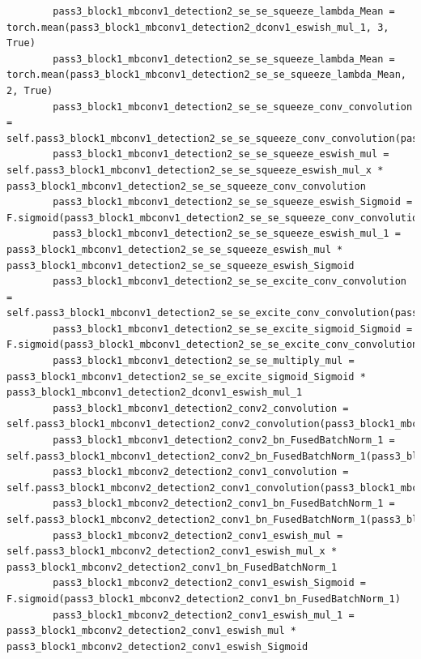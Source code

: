 \documentclass{fisatprojectfinal}
\begin{document}
\begin{appendices}
\begin{lstlisting}
        pass3_block1_mbconv1_detection2_se_se_squeeze_lambda_Mean = torch.mean(pass3_block1_mbconv1_detection2_dconv1_eswish_mul_1, 3, True)
        pass3_block1_mbconv1_detection2_se_se_squeeze_lambda_Mean = torch.mean(pass3_block1_mbconv1_detection2_se_se_squeeze_lambda_Mean, 2, True)
        pass3_block1_mbconv1_detection2_se_se_squeeze_conv_convolution = self.pass3_block1_mbconv1_detection2_se_se_squeeze_conv_convolution(pass3_block1_mbconv1_detection2_se_se_squeeze_lambda_Mean)
        pass3_block1_mbconv1_detection2_se_se_squeeze_eswish_mul = self.pass3_block1_mbconv1_detection2_se_se_squeeze_eswish_mul_x * pass3_block1_mbconv1_detection2_se_se_squeeze_conv_convolution
        pass3_block1_mbconv1_detection2_se_se_squeeze_eswish_Sigmoid = F.sigmoid(pass3_block1_mbconv1_detection2_se_se_squeeze_conv_convolution)
        pass3_block1_mbconv1_detection2_se_se_squeeze_eswish_mul_1 = pass3_block1_mbconv1_detection2_se_se_squeeze_eswish_mul * pass3_block1_mbconv1_detection2_se_se_squeeze_eswish_Sigmoid
        pass3_block1_mbconv1_detection2_se_se_excite_conv_convolution = self.pass3_block1_mbconv1_detection2_se_se_excite_conv_convolution(pass3_block1_mbconv1_detection2_se_se_squeeze_eswish_mul_1)
        pass3_block1_mbconv1_detection2_se_se_excite_sigmoid_Sigmoid = F.sigmoid(pass3_block1_mbconv1_detection2_se_se_excite_conv_convolution)
        pass3_block1_mbconv1_detection2_se_se_multiply_mul = pass3_block1_mbconv1_detection2_se_se_excite_sigmoid_Sigmoid * pass3_block1_mbconv1_detection2_dconv1_eswish_mul_1
        pass3_block1_mbconv1_detection2_conv2_convolution = self.pass3_block1_mbconv1_detection2_conv2_convolution(pass3_block1_mbconv1_detection2_se_se_multiply_mul)
        pass3_block1_mbconv1_detection2_conv2_bn_FusedBatchNorm_1 = self.pass3_block1_mbconv1_detection2_conv2_bn_FusedBatchNorm_1(pass3_block1_mbconv1_detection2_conv2_convolution)
        pass3_block1_mbconv2_detection2_conv1_convolution = self.pass3_block1_mbconv2_detection2_conv1_convolution(pass3_block1_mbconv1_detection2_conv2_bn_FusedBatchNorm_1)
        pass3_block1_mbconv2_detection2_conv1_bn_FusedBatchNorm_1 = self.pass3_block1_mbconv2_detection2_conv1_bn_FusedBatchNorm_1(pass3_block1_mbconv2_detection2_conv1_convolution)
        pass3_block1_mbconv2_detection2_conv1_eswish_mul = self.pass3_block1_mbconv2_detection2_conv1_eswish_mul_x * pass3_block1_mbconv2_detection2_conv1_bn_FusedBatchNorm_1
        pass3_block1_mbconv2_detection2_conv1_eswish_Sigmoid = F.sigmoid(pass3_block1_mbconv2_detection2_conv1_bn_FusedBatchNorm_1)
        pass3_block1_mbconv2_detection2_conv1_eswish_mul_1 = pass3_block1_mbconv2_detection2_conv1_eswish_mul * pass3_block1_mbconv2_detection2_conv1_eswish_Sigmoid

\end{lstlisting}
\end{appendices}
\end{document}
